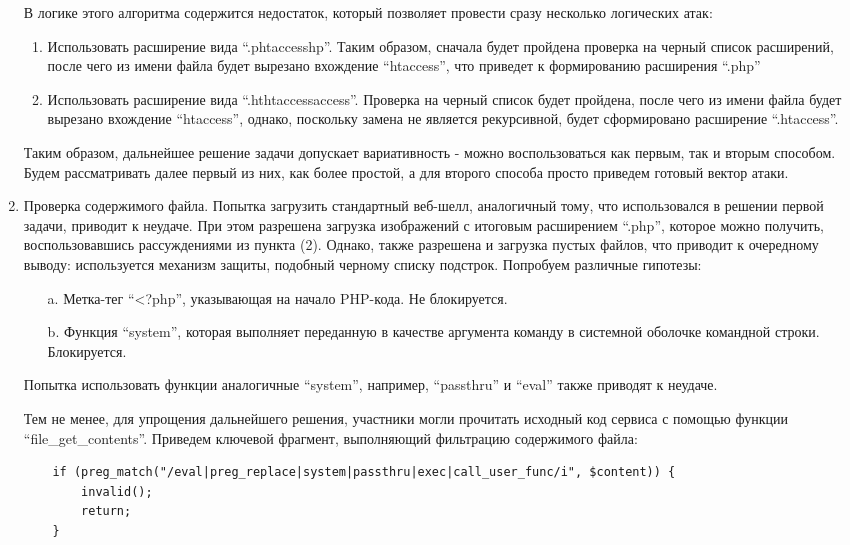 \begin{enumerate}
    В логике этого алгоритма содержится недостаток, который позволяет провести сразу несколько логических атак:
    \begin{enumerate}
        \item Использовать расширение вида “.phtaccesshp”. Таким образом, сначала будет пройдена проверка на черный список расширений, после чего из имени файла будет вырезано вхождение “htaccess”, что приведет к формированию расширения “.php”
        \item Использовать расширение вида “.hthtaccessaccess”. Проверка на черный список будет пройдена, после чего из имени файла будет вырезано вхождение “htaccess”, однако, поскольку замена не является рекурсивной, будет сформировано расширение “.htaccess”.
    \end{enumerate}

    Таким образом, дальнейшее решение задачи допускает вариативность - можно воспользоваться как первым, так и вторым способом. Будем рассматривать далее первый из них, как более простой, а для второго способа просто приведем готовый вектор атаки.
    \item Проверка содержимого файла. Попытка загрузить стандартный веб-шелл, аналогичный тому, что использовался в решении первой задачи, приводит к неудаче. При этом разрешена загрузка изображений с итоговым расширением “.php”, которое можно получить, воспользовавшись рассуждениями из пункта (2). Однако, также разрешена и загрузка пустых файлов, что приводит к очередному выводу: используется механизм защиты, подобный черному списку подстрок. Попробуем различные гипотезы:
    \begin{enumerate}
        \item[a.] Метка-тег “<?php”, указывающая на начало PHP-кода. Не блокируется.
        \item[b.] Функция “system”, которая выполняет переданную в качестве аргумента команду в системной оболочке командной строки. Блокируется.
    \end{enumerate}
    
    Попытка использовать функции аналогичные “system”, например, “passthru” и “eval” также приводят к неудаче.

    Тем не менее, для упрощения дальнейшего решения, участники могли прочитать исходный код сервиса с помощью функции “file\_get\_contents”. Приведем ключевой фрагмент, выполняющий фильтрацию содержимого файла:

    \begin{verbatim}
    if (preg_match("/eval|preg_replace|system|passthru|exec|call_user_func/i", $content)) {
        invalid();
        return;
    }    
    \end{verbatim}


\end{enumerate}
